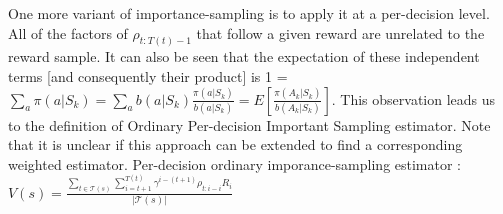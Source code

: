 One more variant of importance-sampling is to apply it at a per-decision level. All of the factors of \( \rho_{t:T(t)-1} \) that follow a given reward are unrelated to the reward sample. It can also be seen that the expectation of these independent terms [and consequently their product] is 1 = \( \sum_a \pi(a | S_k) = \sum_a b(a|S_k) \frac{\pi(a|S_k)}{b(a|S_k)} = E[\frac{\pi(A_k|S_k)}{b(A_k|S_k)}] \).
This observation leads us to the definition of Ordinary Per-decision Important Sampling estimator. Note that it is unclear if this approach can be extended to find a corresponding weighted estimator.
Per-decision ordinary imporance-sampling estimator : \( V(s) = \frac{\sum_{t \in \mathcal{T}(s)} \sum_{i=t+1}^{T(t)} \gamma^{i - (t+1)} \rho_{t:i-i} R_i }{|\mathcal{T}(s)|} \)